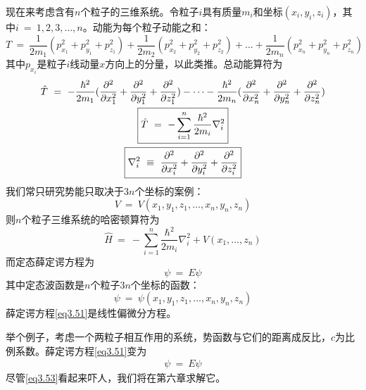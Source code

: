 \documentclass[12pt,a4paper,openany]{ctexbook}
\begin{document}
\begin{flushleft}
现在来考虑含有$n$个粒子的三维系统。令粒子$i$具有质量$m_i$和坐标$(x_i,y_i,z_i)$，其中$i\ =\ 1,2,3,\dots,n$。动能为每个粒子动能之和：
\begin{equation*}
    T\ =\ \frac{1}{2m_1}(p_{x_1}^2+p_{y_1}^2+p_{z_1}^2)+\frac{1}{2m_2}(p_{x_2}^2+p_{y_2}^2+p_{z_2}^2)+\dots+\frac{1}{2m_n}(p_{x_n}^2+p_{y_n}^2+p_{z_n}^2)
\end{equation*}
其中$p_{x_i}$是粒子$i$线动量$x$方向上的分量，以此类推。总动能算符为
\begin{gather}
    \hat{T}\ =\ -\frac{\hbar^2}{2m_1}(\frac{\partial^2}{\partial x_1^2}+\frac{\partial^2}{\partial y_1^2}+\frac{\partial^2}{\partial z_1^2})-\dots-\frac{\hbar^2}{2m_n}(\frac{\partial^2}{\partial x_n^2}+\frac{\partial^2}{\partial y_n^2}+\frac{\partial^2}{\partial z_n^2}) \notag \\
    \boxed{\hat{T}\ =\ -\sum_{i=1}^n\frac{\hbar^2}{2m_i}\nabla_i^2} \label{eq3.48} \\
    \boxed{\nabla_i^2\ \equiv\ \frac{\partial^2}{\partial x_i^2}+\frac{\partial^2}{\partial y_i^2}+\frac{\partial^2}{\partial z_i^2}} \label{eq3.49}
\end{gather}
我们常只研究势能只取决于$3n$个坐标的案例：
\begin{equation*}
    V\ =\ V(x_1,y_1,z_1,\dots,x_n,y_n,z_n)
\end{equation*}
则$n$个粒子三维系统的哈密顿算符为
\begin{equation}
    \boxed{\hat{H}\ =\ -\sum_{i=1}^n\frac{\hbar^2}{2m_i}\nabla_i^2+V(x_1,\dots,z_n)} \label{eq3.50}
\end{equation}
而定态薛定谔方程为
\begin{equation}
    [-\sum_{i=1}^n\frac{\hbar^2}{2m_i}\nabla_i^2+V(x_1,\dots,z_n)]\psi\ =\ E\psi \label{eq3.51}
\end{equation}
其中定态波函数是$n$个粒子$3n$个坐标的函数：
\begin{equation}
    \psi\ =\ \psi(x_1,y_1,z_1,\dots,x_n,y_n,z_n)
\end{equation}
薛定谔方程\eqref{eq3.51}是线性偏微分方程。

举个例子，考虑一个两粒子相互作用的系统，势函数与它们的距离成反比，$c$为比例系数。薛定谔方程\eqref{eq3.51}变为
\begin{multline}
    [-\frac{\hbar^2}{2m_1}(\frac{\partial^2}{\partial x_1^2}+\frac{\partial^2}{\partial y_1^2}+\frac{\partial^2}{\partial z_1^2})-\frac{\hbar^2}{2m_2}(\frac{\partial^2}{\partial x_2^2}+\frac{\partial^2}{\partial y_2^2}+\frac{\partial^2}{\partial z_2^2}) \\
    +\frac{c}{[(x_1-x_2)^2+(y_1-y_2)^2+(z_1-z_2)^2]^{1/2}}]\psi\ =\ E\psi \label{eq3.53}
\end{multline}
尽管\eqref{eq3.53}看起来吓人，我们将在第六章求解它。


\end{flushleft}
\end{document}
